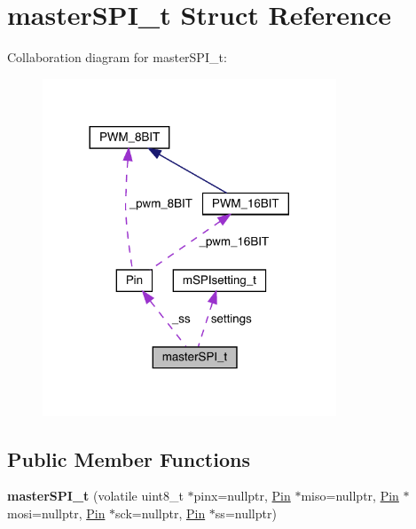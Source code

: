 \hypertarget{structmasterSPI__t}{}\section{master\+S\+P\+I\+\_\+t Struct Reference}
\label{structmasterSPI__t}


Collaboration diagram for master\+S\+P\+I\+\_\+t\+:\nopagebreak
\begin{figure}[H]
\begin{center}
\leavevmode
\includegraphics[width=248pt]{structmasterSPI__t__coll__graph}
\end{center}
\end{figure}
\subsection*{Public Member Functions}
\begin{DoxyCompactItemize}
\item 
\mbox{\label{structmasterSPI__t_a3344d8520f2e855f5ecf53bfe03415fe}} 
{\bfseries master\+S\+P\+I\+\_\+t} (volatile uint8\+\_\+t $\ast$pinx=nullptr, \hyperlink{classPin}{Pin} $\ast$miso=nullptr, \hyperlink{classPin}{Pin} $\ast$mosi=nullptr, \hyperlink{classPin}{Pin} $\ast$sck=nullptr, \hyperlink{classPin}{Pin} $\ast$ss=nullptr)
\end{DoxyCompactItemize}
